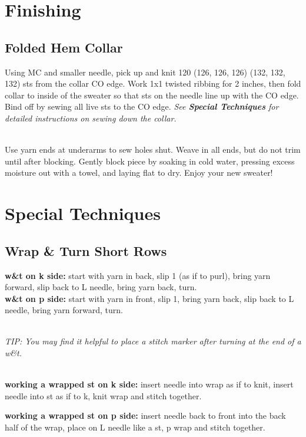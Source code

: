 \documentclass[12pt]{article}
\newcommand{\rowDir}[1]{\textbf{#1:}} %
\begin{document}
\begin{multicols}{2}
\newpage

\section*{Finishing}

\subsection*{Folded Hem Collar}

Using MC and smaller needle, pick up and knit 
120 (126, 126, 126) (132, 132, 132) sts from the collar CO edge. Work 1x1 twisted ribbing for 2 inches, then fold collar to inside of the sweater so that sts on the needle line up with the CO edge. Bind off by sewing all live sts to the CO edge. \emph{See \textbf{Special Techniques} for detailed instructions on sewing down the collar.}

~\\
Use yarn ends at underarms to sew holes shut. Weave in all ends, but do not trim until after blocking. Gently block piece by soaking in cold water, pressing excess moisture out with a towel, and laying flat to dry. Enjoy your new sweater!


\section*{Special Techniques}
\subsection*{Wrap \& Turn Short Rows}
\rowDir{w\&t on k side} start with yarn in back, slip 1 (as if to purl), bring yarn forward, slip back to L needle, bring yarn back, turn. \\
\rowDir{w\&t on p side} start with yarn in front, slip 1, bring yarn back, slip back to L needle, bring yarn forward, turn.

~\\
\emph{TIP: You may find it helpful to place a stitch marker after turning at the end of a w\&t.}


~\\
\rowDir{working a wrapped st on k side} insert needle into wrap as if to knit, insert needle into st as if to k, knit wrap and stitch together.

\rowDir{working a wrapped st on p side} insert needle back to front into the back half of the wrap, place on L needle like a st, p wrap and stitch together.



\end{multicols}
\end{document}
